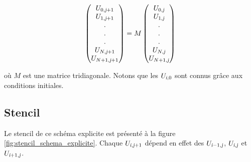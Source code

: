 \documentclass[a4paper, 12pt]{report}
\begin{document}
\begin{equation}
\begin{pmatrix}
   U_{0,\textsl{j}+1} \\
   U_{1,\textsl{j}+1} \\
   .\\
   .\\
   .\\
   U_{N,\textsl{j}+1}\\
   U_{N+1,\textsl{j}+1}
\end{pmatrix}
=
M
\begin{pmatrix}
   U_{0,\textsl{j}} \\
   U_{1,\textsl{j}} \\
   .\\
   .\\
   .\\
   U_{N,\textsl{j}}\\
   U_{N+1,\textsl{j}}
\end{pmatrix}
\end{equation}

où $M$ est une matrice tridiagonale. Notons que les $U_{\textsl{i},0}$ sont connus
grâce aux conditions initiales.

\subsection*{Stencil}

Le stencil de ce schéma explicite est présenté
à la figure \ref{fig:stencil_schema_explicite}. Chaque $U_{\textsl{i},\textsl{j}+1}$ dépend
en effet des $U_{\textsl{i}-1,\textsl{j}}$, $U_{\textsl{i},\textsl{j}}$ et $U_{\textsl{i}+1,\textsl{j}}$.
\end{document}
